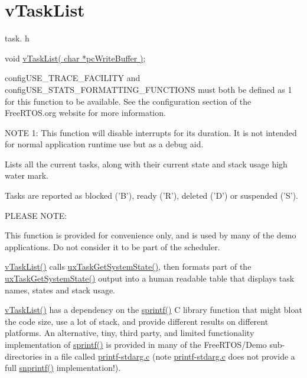 \hypertarget{group__vTaskList}{\section{v\-Task\-List}
\label{group__vTaskList}
}
task. h 
\begin{DoxyPre}void \hyperlink{task_8h_ab87abc717f34ddced76802d12588a93d}{vTaskList( char *pcWriteBuffer )};\end{DoxyPre}


config\-U\-S\-E\-\_\-\-T\-R\-A\-C\-E\-\_\-\-F\-A\-C\-I\-L\-I\-T\-Y and config\-U\-S\-E\-\_\-\-S\-T\-A\-T\-S\-\_\-\-F\-O\-R\-M\-A\-T\-T\-I\-N\-G\-\_\-\-F\-U\-N\-C\-T\-I\-O\-N\-S must both be defined as 1 for this function to be available. See the configuration section of the Free\-R\-T\-O\-S.\-org website for more information.

N\-O\-T\-E 1\-: This function will disable interrupts for its duration. It is not intended for normal application runtime use but as a debug aid.

Lists all the current tasks, along with their current state and stack usage high water mark.

Tasks are reported as blocked ('B'), ready ('R'), deleted ('D') or suspended ('S').

P\-L\-E\-A\-S\-E N\-O\-T\-E\-:

This function is provided for convenience only, and is used by many of the demo applications. Do not consider it to be part of the scheduler.

\hyperlink{task_8h_ab87abc717f34ddced76802d12588a93d}{v\-Task\-List()} calls \hyperlink{task_8h_aa4603f3de3d809e9beb18d10fbac005d}{ux\-Task\-Get\-System\-State()}, then formats part of the \hyperlink{task_8h_aa4603f3de3d809e9beb18d10fbac005d}{ux\-Task\-Get\-System\-State()} output into a human readable table that displays task names, states and stack usage.

\hyperlink{task_8h_ab87abc717f34ddced76802d12588a93d}{v\-Task\-List()} has a dependency on the \hyperlink{printf-stdarg_8c_aa0649118bc3728b2a62af0b47606ff51}{sprintf()} C library function that might bloat the code size, use a lot of stack, and provide different results on different platforms. An alternative, tiny, third party, and limited functionality implementation of \hyperlink{printf-stdarg_8c_aa0649118bc3728b2a62af0b47606ff51}{sprintf()} is provided in many of the Free\-R\-T\-O\-S/\-Demo sub-\/directories in a file called \hyperlink{printf-stdarg_8c}{printf-\/stdarg.\-c} (note \hyperlink{printf-stdarg_8c}{printf-\/stdarg.\-c} does not provide a full \hyperlink{printf-stdarg_8c_a0b3526078beb75778277d06a066c9508}{snprintf()} implementation!).

